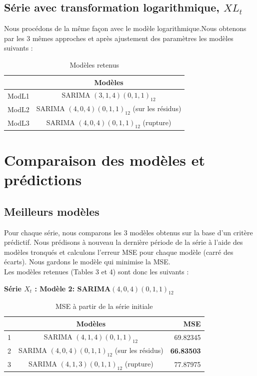 \documentclass[12pt,a4paper]{book}
\newcommand{\1}{\mathds{1}}
\begin{document}
\vspace{20 mm}
\subsection{Série avec transformation logarithmique, $XL_t$}

Nous procédons de la même façon avec le modèle logarithmique.Nous obtenons par les 3 mêmes approches et après ajustement des paramètres les modèles suivants : 

\begin{table}[h!]
  \begin{center}
    \caption{Modèles retenus}
    \label{tab:table1}
    \begin{tabular}{l|c}
      \ & \textbf{Modèles}\\
      \hline
      ModL1 & SARIMA $(3,1,4)(0,1,1)_{12}$\\
      ModL2& SARIMA $(4,0,4)(0,1,1)_{12}$ (sur les résidus)\\
      ModL3 & SARIMA $(4,0,4)(0,1,1)_{12}$ (rupture)\\
    \end{tabular}
  \end{center}
\end{table}

\vspace{5 mm}
\section{Comparaison des modèles et prédictions}

\subsection{Meilleurs modèles}

Pour chaque série, nous comparons les 3 modèles obtenus sur la base d'un critère prédictif. Nous prédisons à nouveau la dernière période de la série à l'aide des modèles tronqués et calculons l'erreur MSE pour chaque modèle (carré des écarts). Nous gardons le modèle qui minimise la MSE.\\
Les modèles retenues (Tables 3 et 4) sont donc les suivants : 

\noindent
\textbf{Série $X_t$ : Modèle 2: SARIMA$(4,0,4)(0,1,1)_{12}$}

\begin{table}[h!]
  \begin{center}
    \caption{MSE à partir de la série initiale}
    \label{tab:table1}
    \begin{tabular}{l|c|r} 
      \ & \textbf{Modèles} & \textbf{MSE}\\
      \hline
      1 & SARIMA $(4,1,4)(0,1,1)_{12}$ & 69.82345\\
      \rowcolor{LightCyan}
      2 & SARIMA $(4,0,4)(0,1,1)_{12}$ (sur les résidus)& \textbf{66.83503}\\
      3 & SARIMA $(4,1,3)(0,1,1)_{12}$ (rupture) & 77.87975\\
    \end{tabular}
  \end{center}
\end{table}
\end{document}
